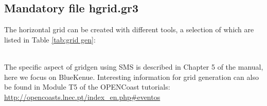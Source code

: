 \documentclass[preprints,briefreport,accept,oneauthor,pdftex]{Definitions/mdpi}
\begin{document}
\subsection{Mandatory file hgrid.gr3}
\noindent The horizontal grid can be created with different tools, a selection of which are listed in Table \ref{tab:grid gen}:
\begin{table}[htbp]
\centering
\caption{Grid generators}
\label{tab:grid gen}
\end{table}\\
\noindent The specific aspect of gridgen using SMS is described in Chapter 5 of the manual, here we focus on BlueKenue. Interesting information for grid generation can also be found in Module T5 of the OPENCoast tutorials:\\
\url{http://opencoasts.lnec.pt/index_en.php#eventos}
\end{document}
